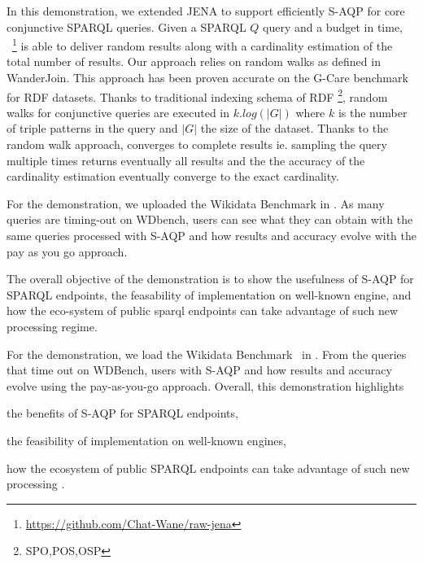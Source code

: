   In this demonstration, we extended JENA to support efficiently
  S-AQP for core conjunctive
  SPARQL queries.  Given a SPARQL $Q$ query and a budget in time,
  \NAME~\footnote{\url{https://github.com/Chat-Wane/raw-jena}} is able
  to deliver random results along with a cardinality estimation of the
  total number of results. Our approach relies on random
 walks as defined in WanderJoin\cite{li2016wanderjoin}. This approach
 has been proven accurate on the G-Care
 benchmark\cite{DBLP:conf/sigmod/ParkKBKHH20} for RDF datasets. Thanks
 to traditional indexing schema of RDF \footnote{SPO,POS,OSP}, random
 walks for conjunctive queries are executed in $k.log(|G|)$ where
 $k$ is the number of triple patterns in the query and $|G|$ the size
 of the dataset. Thanks to the random walk approach, \NAME converges
 to complete results ie. sampling the query multiple times returns
  eventually all results  and the  the accuracy of the cardinality
  estimation eventually converge to the exact cardinality.

  For the demonstration, we uploaded the Wikidata
  Benchmark\cite{angles2022wdbench} in \NAME. As many queries are
  timing-out on WDbench, users can see what they can obtain with the
  same queries processed with S-AQP and how results and
  accuracy evolve with the pay as you go approach.

  The overall objective of the demonstration is to show the usefulness
  of S-AQP for SPARQL endpoints, the feasability of implementation on
  well-known engine, and how the eco-system of public sparql endpoints
  can take advantage of such new processing regime.


\noindent For the demonstration, we load the Wikidata
Benchmark~\cite{angles2022wdbench} in \NAME. From the queries that
time out on WDBench, users  with S-AQP
and how results and accuracy evolve using the pay-as-you-go approach.
Overall, this demonstration highlights
\begin{inparaenum}[(i)]
\item the benefits of S-AQP for SPARQL endpoints,
\item the feasibility of implementation on well-known engines,
\item how the ecosystem of public SPARQL endpoints can take
  advantage of such new processing 
  .
\end{inparaenum}


